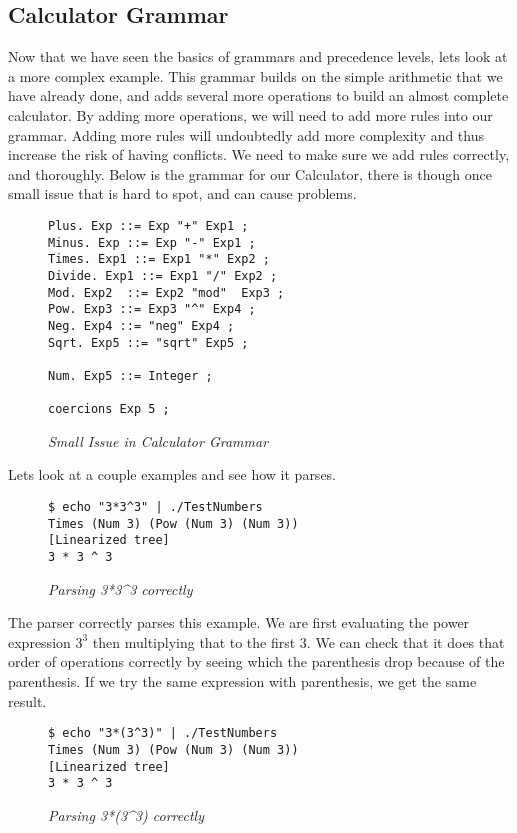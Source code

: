 \documentclass{article}
\begin{document}
\subsection{Calculator Grammar}

\medskip\noindent
Now that we have seen the basics of grammars and precedence levels, lets look at a more complex example. This grammar builds on the simple arithmetic that we have already done, and adds several more operations to build an almost complete calculator. By adding more operations, we will need to add more rules into our grammar. Adding more rules will undoubtedly add more complexity and thus increase the risk of having conflicts. We need to make sure we add rules correctly, and thoroughly. Below is the grammar for our Calculator, there is though once small issue that is hard to spot, and can cause problems.

\begin{figure}[H]
    \begin{lstlisting}
Plus. Exp ::= Exp "+" Exp1 ;
Minus. Exp ::= Exp "-" Exp1 ;
Times. Exp1 ::= Exp1 "*" Exp2 ;
Divide. Exp1 ::= Exp1 "/" Exp2 ;
Mod. Exp2  ::= Exp2 "mod"  Exp3 ;
Pow. Exp3 ::= Exp3 "^" Exp4 ;
Neg. Exp4 ::= "neg" Exp4 ;
Sqrt. Exp5 ::= "sqrt" Exp5 ;

Num. Exp5 ::= Integer ;

coercions Exp 5 ;
    \end{lstlisting}
    \caption{\textit{Small Issue in Calculator Grammar}}
\end{figure}

\medskip\noindent
Lets look at a couple examples and see how it parses. 

\begin{figure}[H]
    \begin{lstlisting}
$ echo "3*3^3" | ./TestNumbers   
Times (Num 3) (Pow (Num 3) (Num 3))
[Linearized tree]
3 * 3 ^ 3
    \end{lstlisting}
    \caption{\textit{Parsing 3*3^3 correctly}}
\end{figure}

\medskip\noindent
The parser correctly parses this example. We are first evaluating the power expression $3^3$ then multiplying that to the first 3. We can check that it does that order of operations correctly by seeing which the parenthesis drop because of the parenthesis. If we try the same expression with parenthesis, we get the same result.

 
 \begin{figure}[H]
    \begin{lstlisting}
$ echo "3*(3^3)" | ./TestNumbers 
Times (Num 3) (Pow (Num 3) (Num 3))
[Linearized tree]
3 * 3 ^ 3
    \end{lstlisting}
    \caption{\textit{Parsing 3*(3^3) correctly}}
\end{figure}
\end{document}
